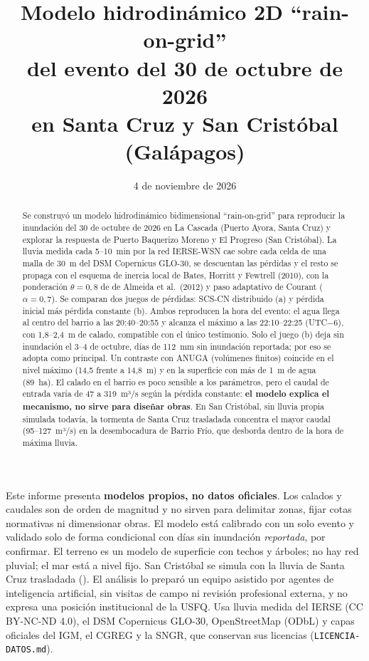 \documentclass{sosg-informe}
\title{Modelo hidrodinámico 2D \enquote{rain-on-grid}\\del evento del 30 de octubre de 2026\\en Santa Cruz y San Cristóbal (Galápagos)}
\date{4 de noviembre de 2026}
\begin{document}
\maketitle

\begin{abstract}
Se construyó un modelo hidrodinámico bidimensional \enquote{rain-on-grid} para reproducir la inundación del 30 de octubre de 2026 en La Cascada (Puerto Ayora, Santa Cruz) y explorar la respuesta de Puerto Baquerizo Moreno y El Progreso (San Cristóbal). La lluvia medida cada 5--10~min por la red IERSE-WSN cae sobre cada celda de una malla de 30~m del DSM Copernicus GLO-30, se descuentan las pérdidas y el resto se propaga con el esquema de inercia local de Bates, Horritt y Fewtrell (2010), con la ponderación $\theta = 0,8$ de de Almeida et al.\ (2012) y paso adaptativo de Courant ($\alpha = 0,7$). Se comparan dos juegos de pérdidas: SCS-CN distribuido (a) y pérdida inicial más pérdida constante (b). Ambos reproducen la hora del evento: el agua llega al centro del barrio a las 20:40--20:55 y alcanza el máximo a las 22:10--22:25 (UTC$-6$), con 1,8--2,4~m de calado, compatible con el único testimonio. Solo el juego (b) deja sin inundación el 3--4 de octubre, días de 112~mm sin inundación reportada; por eso se adopta como principal. Un contraste con ANUGA (volúmenes finitos) coincide en el nivel máximo (14,5 frente a 14,8~m) y en la superficie con más de 1~m de agua (89~ha). El calado en el barrio es poco sensible a los parámetros, pero el caudal de entrada varía de 47 a 319~m³/s según la pérdida constante: \textbf{el modelo explica el mecanismo, no sirve para diseñar obras}. En San Cristóbal, sin lluvia propia simulada todavía, la tormenta de Santa Cruz trasladada concentra el mayor caudal (95--127~m³/s) en la desembocadura de Barrio Frío, que desborda dentro de la hora de máxima lluvia.
\end{abstract}

\begin{aviso}
Este informe presenta \textbf{modelos propios, no datos oficiales}. Los calados y caudales son de orden de magnitud y no sirven para delimitar zonas, fijar cotas normativas ni dimensionar obras. El modelo está calibrado con un solo evento y validado solo de forma condicional con días sin inundación \emph{reportada}, por confirmar. El terreno es un modelo de superficie con techos y árboles; no hay red pluvial; el mar está a nivel fijo. San Cristóbal se simula con la lluvia de Santa Cruz trasladada (). El análisis lo preparó un equipo asistido por agentes de inteligencia artificial, sin visitas de campo ni revisión profesional externa, y no expresa una posición institucional de la USFQ. Usa lluvia medida del IERSE (CC BY-NC-ND 4.0), el DSM Copernicus GLO-30, OpenStreetMap (ODbL) y capas oficiales del IGM, el CGREG y la SNGR, que conservan sus licencias (\texttt{LICENCIA-DATOS.md}).
\end{aviso}
\end{document}
